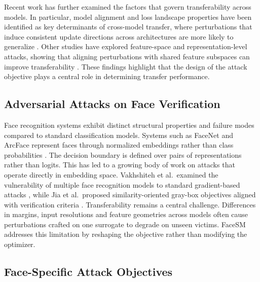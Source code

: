 \documentclass[a4paper,fleqn]{cas-dc}
\begin{document}
Recent work has further examined the factors that govern transferability across models. In particular, model alignment and loss landscape properties have been identified as key determinants of cross-model transfer, where perturbations that induce consistent update directions across architectures are more likely to generalize \citet{ma2024improving,wang2021enhancing}. Other studies have explored feature-space and representation-level attacks, showing that aligning perturbations with shared feature subspaces can improve transferability \citet{inkawhich2019feature}. These findings highlight that the design of the attack objective plays a central role in determining transfer performance.

\subsection{Adversarial Attacks on Face Verification}

Face recognition systems exhibit distinct structural properties and failure modes compared to standard classification models. Systems such as FaceNet and ArcFace represent faces through normalized embeddings rather than class probabilities \citet{schroff2015facenet,deng2019arcface}. The decision boundary is defined over pairs of representations rather than logits. This has led to a growing body of work on attacks that operate directly in embedding space. Vakhshiteh et al.\ examined the vulnerability of multiple face recognition models to standard gradient-based attacks \citet{vakhshiteh2021adversarial}, while Jia et al.\ proposed similarity-oriented gray-box objectives aligned with verification criteria \citet{wang2021similarity}. Transferability remains a central challenge. Differences in margins, input resolutions and feature geometries across models often cause perturbations crafted on one surrogate to degrade on unseen victims. FaceSM addresses this limitation by reshaping the objective rather than modifying the optimizer.

\subsection{Face-Specific Attack Objectives}
\end{document}
